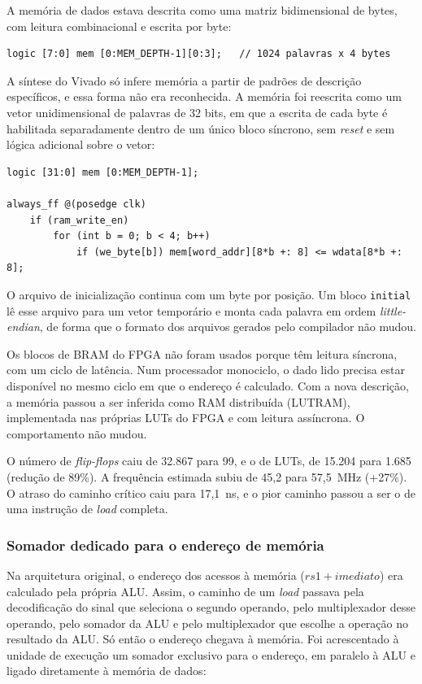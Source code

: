 A memória de dados estava descrita como uma matriz bidimensional de bytes,
com leitura combinacional e escrita por byte:

\begin{lstlisting}
logic [7:0] mem [0:MEM_DEPTH-1][0:3];   // 1024 palavras x 4 bytes
\end{lstlisting}

A síntese do Vivado só infere memória a partir de padrões de descrição
específicos, e essa forma não era reconhecida. A memória foi reescrita como
um vetor unidimensional de palavras de 32 bits, em que a escrita de cada byte
é habilitada separadamente dentro de um único bloco síncrono, sem
\textit{reset} e sem lógica adicional sobre o vetor:

\begin{lstlisting}
logic [31:0] mem [0:MEM_DEPTH-1];

always_ff @(posedge clk)
    if (ram_write_en)
        for (int b = 0; b < 4; b++)
            if (we_byte[b]) mem[word_addr][8*b +: 8] <= wdata[8*b +: 8];
\end{lstlisting}

O arquivo de inicialização continua com um byte por posição. Um bloco
\texttt{initial} lê esse arquivo para um vetor temporário e monta cada palavra
em ordem \textit{little-endian}, de forma que o formato dos arquivos gerados
pelo compilador não mudou.

Os blocos de BRAM do FPGA não foram usados porque têm leitura síncrona, com
um ciclo de latência. Num processador monociclo, o dado lido precisa estar
disponível no mesmo ciclo em que o endereço é calculado. Com a nova
descrição, a memória passou a ser inferida como RAM distribuída (LUTRAM),
implementada nas próprias LUTs do FPGA e com leitura assíncrona. O
comportamento não mudou.

O número de \textit{flip-flops} caiu de 32.867 para 99, e o de LUTs, de
15.204 para 1.685 (redução de 89\%). A frequência estimada subiu de 45,2
para 57,5~MHz (+27\%). O atraso do caminho crítico caiu para 17,1~ns, e o
pior caminho passou a ser o de uma instrução de \textit{load} completa.

\subsubsection{Somador dedicado para o endereço de memória}

Na arquitetura original, o endereço dos acessos à memória
($\mathit{rs1} + \mathit{imediato}$) era calculado pela própria ALU.
Assim, o caminho de um \textit{load} passava pela decodificação do sinal que
seleciona o segundo operando, pelo multiplexador desse operando, pelo
somador da ALU e pelo multiplexador que escolhe a operação no resultado da
ALU. Só então o endereço chegava à memória. Foi acrescentado à unidade de
execução um somador exclusivo para o endereço, em paralelo à ALU e ligado
diretamente à memória de dados:

